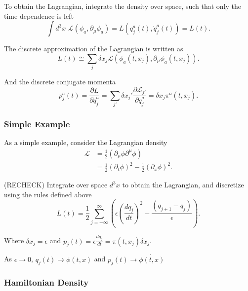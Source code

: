 \noindent To obtain the Lagrangian, integrate the density over space, such that only the time dependence is left
\begin{equation}
\int d^3 x \,\, \mathscr{L} (\phi_a, \partial_\mu \phi_a) = L(q_j^a (t), \dot{q}_j^a (t)) = L(t) . 
\end{equation}

\noindent The discrete approximation of the Lagrangian is written as 
\begin{equation}
L(t) \cong \sum_j \delta x_j \mathscr{L}(\phi_a(t, x_j), \partial_\mu \phi_a(t, x_j)). 
\end{equation}

\noindent And the discrete conjugate momenta 
\begin{equation}
p_j^a(t) = \frac{\partial L}{\partial \dot{q}_j^a} = \sum_{j'} \delta {x_j'} \frac{\partial \mathscr{L}_{j'}}{\partial \dot{q}_j^a} = \delta x_j \pi^a(t, x_j).
\end{equation}

\subsubsection*{Simple Example}

\noindent As a simple example, consider the Lagrangian density 
\begin{align}
\mathscr{L} &= \frac{1}{2} (\partial_\mu \phi \partial^\mu \phi) \\
&= \frac{1}{2}(\partial_t \phi)^2 - \frac{1}{2} (\partial_x \phi)^2 .
\end{align}

\noindent (RECHECK) Integrate over space $d^3 x$ to obtain the Lagrangian, and discretize using the rules defined above
\begin{equation}
L(t) = \frac{1}{2} \sum_{j=-\infty}^{\infty} \left( \epsilon \left( \frac{d q_j}{d t} \right)^2 - \frac{(q_{j+1} - q_j)}{\epsilon} \right) .
\end{equation}

\noindent Where $\delta x_j = \epsilon$ and $p_j(t) = \epsilon \frac{d q_j}{dt} = \pi(t, x_j) \delta x_j $. 

\noindent As $\epsilon \rightarrow 0$, $q_j(t) \rightarrow \phi(t, x)$ and $p_j(t) \rightarrow \dot{\phi(t, x)}$

\subsubsection*{Hamiltonian Density}

